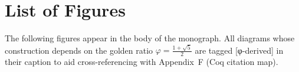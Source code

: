 %
%

\chapter*{List of Figures}
\thispagestyle{plain}

\noindent
The following figures appear in the body of the monograph.
All diagrams whose construction depends on the golden ratio
\(\varphi = \tfrac{1+\sqrt{5}}{2}\) are tagged \textsf{[φ-derived]}
in their caption to aid cross-referencing with Appendix~F
(Coq citation map).

\bigskip

\listoffigures
